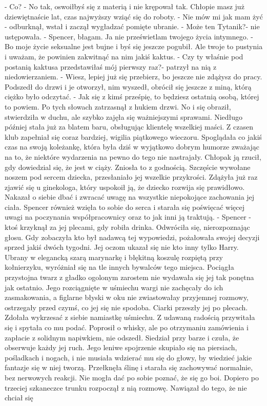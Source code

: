 \documentclass[12pt,a4paper]{book}
\begin{document}
- Co?
- No tak, oswoiłbyś się z materią i nie krępował tak. Chłopie masz już dziewiętnaście lat, czas najwyższy wziąć się do roboty.
- Nie mów mi jak mam żyć - odburknął, wstał i zaczął wygładzać pomięte ubranie.
- Może ten Tytanik?- nie ustępowała.
- Spencer, błagam. Ja nie prześwietlam twojego życia intymnego.
- Bo moje życie seksualne jest bujne i byś się jeszcze pogubił. Ale twoje to pustynia i uważam, że powinien zakwitnąć na nim jakiś kaktus.
- Czy ty właśnie pod postanią kaktusa przedstawiłaś mój pierwszy raz?- patrzył na nią z niedowierzaniem. - Wiesz, lepiej już się przebierz, bo jeszcze nie zdążysz do pracy. 
Podszedł do drzwi i je otworzył, nim wyszedł, obrócił się jeszcze z miną, którą ciężko było odczytać. 
- Jak się z kimś prześpię, to będziesz ostatnią osobą, której to powiem. 
Po tych słowach zatrzasnął z hukiem drzwi. 
No i się obraził, stwierdziła w duchu, ale szybko zajęła się ważniejszymi sprawami. Niedługo później stała już za blatem baru, obsługując klientelę wszelkiej maści. Z czasen klub zapełniał się coraz bardziej, wigilia piątkowego wieczoru. Spoglądała co jakiś czas na
swoją koleżankę, która była dziś w wyjątkowo dobrym humorze zważając na to, że niektóre wydarzenia na pewno do tego nie  nastrajały. Chłopak ją rzucił, gdy dowiedzial się, że jest w ciąży. Zniosła to z godnością. Szczęście wywołane noszem pod sercem dziecka, przesłaniało jej wszelkie przykrości. Zdążyła już raz zjawić się u ginekologa, który uspokoił ją, że dziecko rozwija się prawidłowo. Nakazał o siebie dbać i zwracać uwagę na wszystkie niepokojące zachowania jej ciała. Spencer również wzięła to sobie do serca i starała się poświęcać więcej uwagi na poczynania współpracownicy oraz to jak inni ją traktują. 
- Spencer - ktoś krzyknął za jej plecami, gdy robiła drinka. 
Odwróciła się, nierozpoznając głosu. Gdy zobaczyła kto był nadawcą tej wypowiedzi, pożałowała swojej decyzji sprzed jakiś dwóch tygodni. Jej oczom ukazał się nie kto inny tylko Harry. Ubrany w elegancką szarą marynarkę i błękitną koszulę rozpiętą przy
kołnierzyku, wyróżniał się na tle innych bywalców tego miejsca. Pociągła przystojna twarz z gładko ogolonym zarostem nie wydawała się jej tak ponętna jak ostatnio. Jego rozciągnięte w uśmiechu wargi nie zachęcały do ich zasmakowania, a figlarne błyski w oku nie zwiastowałay przyjemnej rozmowy, ostrzegały przed czymś, co jej się nie spodoba. Ciarki przeszły jej po plecach. Zdołała wykrzesać z siebie namiastkę uśmiechu. Z udawaną radością przywitała się i spytała co mu podać. Poprosił o whisky, ale po otrzymaniu zamówienia i zapłacie z solidnym napiwkiem, nie odszedł. Siedział przy barze i czuła, że obserwuje każdy jej ruch. Jego leniwe spojrzenie skupiało się na piersiach, pośladkach i nogach, i nie musiała wdzierać mu się do głowy, by wiedzieć jakie fantazje się w niej tworzą. Przełknęła ślinę i starała się zachowywać normalnie, bez nerwowych reakcji. Nie mogła dać po sobie poznać, że się go boi. Dopiero po trzeciej szkaneczce trunku rozpoczął z nią rozmowę. Nawiązał do tego, że nie chciał się
\end{document}

